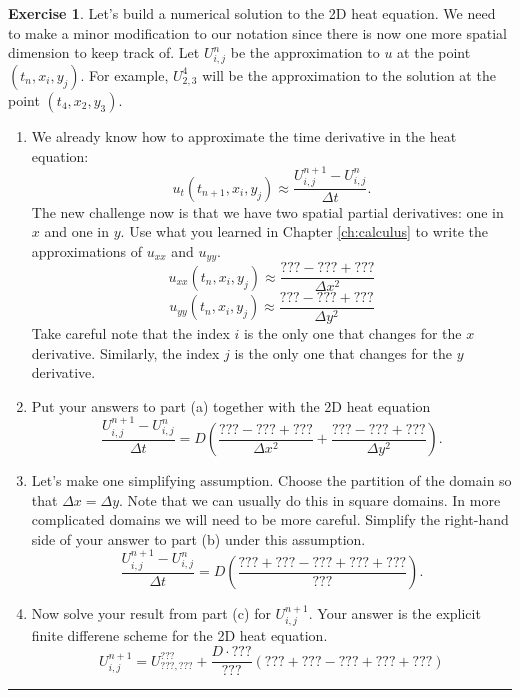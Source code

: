 \documentclass[
]{book}
\providecommand{\tightlist}{%
  \setlength{\itemsep}{0pt}\setlength{\parskip}{0pt}}
\theoremstyle{definition}
\theoremstyle{definition}
\theoremstyle{definition}
\newtheorem{exercise}{Exercise}[chapter]
\theoremstyle{remark}
\begin{document}
\begin{exercise}
\protect\hypertarget{exr:unnamed-chunk-556}{}{\label{exr:unnamed-chunk-556} }Let's build a numerical solution to the 2D heat equation. We need to make a minor modification to our notation since there is now one more spatial dimension to keep track of. Let \(U_{i,j}^n\) be the approximation to \(u\) at the point \((t_n, x_i, y_j)\). For example, \(U_{2,3}^4\) will be the approximation to the solution at the point \((t_4,x_2,y_3)\).

\begin{enumerate}
\def\labelenumi{\alph{enumi}.}
\tightlist
\item
  We already know how to approximate the time derivative in the heat equation:
  \[ u_t(t_{n+1}, x_i, y_j) \approx \frac{U_{i,j}^{n+1} - U_{i,j}^n}{\Delta t}. \]
  The new challenge now is that we have two spatial partial derivatives: one in \(x\) and one in \(y\). Use what you learned in Chapter \ref{ch:calculus} to write the approximations of \(u_{xx}\) and \(u_{yy}\).
  \[ u_{xx}(t_n,x_i,y_j) \approx \frac{??? - ??? + ???}{\Delta x^2} \]
  \[ u_{yy}(t_n,x_i,y_j) \approx \frac{??? - ??? + ???}{\Delta y^2} \]
  Take careful note that the index \(i\) is the only one that changes for the \(x\) derivative. Similarly, the index \(j\) is the only one that changes for the \(y\) derivative.
\item
  Put your answers to part (a) together with the 2D heat equation
  \[ \frac{U_{i,j}^{n+1} - U_{i,j}^n}{\Delta t} = D \left( \frac{??? - ??? + ???}{\Delta x^2} + \frac{??? - ??? + ???}{\Delta y^2} \right). \]
\item
  Let's make one simplifying assumption. Choose the partition of the domain so that \(\Delta x = \Delta y\). Note that we can usually do this in square domains. In more complicated domains we will need to be more careful. Simplify the right-hand side of your answer to part (b) under this assumption.
  \[ \frac{U_{i,j}^{n+1} - U_{i,j}^n}{\Delta t} = D \left( \frac{??? + ??? - ??? + ??? + ???}{???} \right). \]
\item
  Now solve your result from part (c) for \(U_{i,j}^{n+1}\). Your answer is the explicit finite differene scheme for the 2D heat equation.
  \[ U_{i,j}^{n+1} = U_{???,???}^{???} + \frac{D \cdot ???}{???} \left( ??? + ??? - ??? + ??? + ??? \right) \]
\end{enumerate}
\end{exercise}

\begin{center}\rule{0.5\linewidth}{0.5pt}\end{center}
\end{document}
